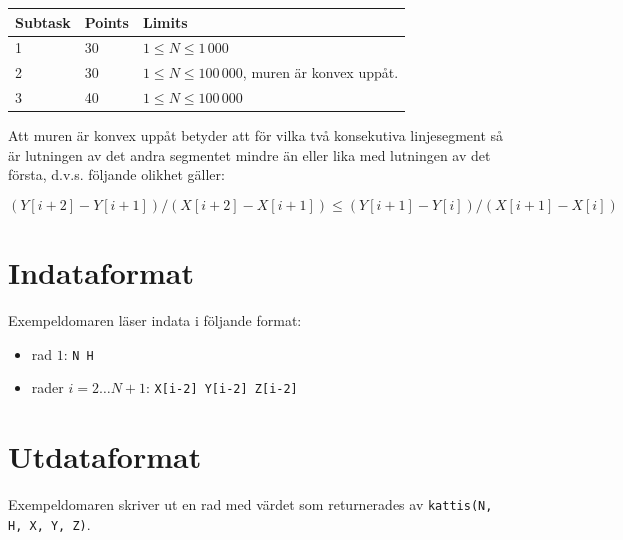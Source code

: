 \begin{tabular}{|l|l|l|}
  \hline
  \textbf{Subtask} & \textbf{Points} & \textbf{Limits} \\ \hline
  1 & 30 & $1 \le N \le 1\,000$ \\ \hline
  2 & 30 & $1 \le N \le 100\,000$, muren är konvex uppåt. \\ \hline
  3 & 40 & $1 \le N \le 100\,000$ \\ \hline
\end{tabular}

Att muren är konvex uppåt betyder att för vilka två konsekutiva linjesegment så är lutningen av det andra segmentet mindre än eller lika med lutningen av det första, d.v.s. följande olikhet gäller:

$$(Y[i+2] - Y[i+1]) / (X[i+2] - X[i+1]) \le (Y[i+1] - Y[i]) / (X[i+1] - X[i])$$

\section*{Indataformat}
Exempeldomaren läser indata i följande format:

\begin{itemize}
  \item rad $1$: \texttt{N H}
  \item rader $i = 2 \dots N+1$: \texttt{X[i-2] Y[i-2] Z[i-2]}
\end{itemize}

\section*{Utdataformat}
Exempeldomaren skriver ut en rad med värdet som returnerades av \texttt{kattis(N, H, X, Y, Z)}.
